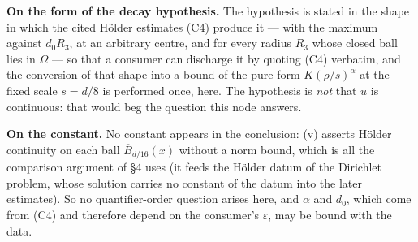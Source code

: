 \begin{lemma}
\noindent\textbf{On the form of the decay hypothesis.}  The hypothesis is
stated in the shape in which the cited H\"older estimates (C4) produce it ---
with the maximum against
$d_0R_3$, at an arbitrary centre, and for every radius $R_3$ whose closed ball
lies in $\Omega$ --- so that a consumer can discharge it by quoting (C4)
verbatim, and the conversion of that shape into a bound of the pure form
$K(\rho/s)^\alpha$ at the fixed scale $s=d/8$ is performed once, here.  The
hypothesis is \emph{not} that $u$ is continuous: that would beg the question
this node answers.

\noindent\textbf{On the constant.}  No constant appears in the conclusion: (v)
asserts H\"older continuity on each ball $\overline B_{d/16}(x)$ without a
norm bound, which is all the comparison argument of \S4 uses (it feeds the
H\"older datum of the Dirichlet problem, whose solution carries no constant of
the datum into the later estimates).  So no quantifier-order question arises
here, and $\alpha$ and $d_0$, which come from (C4) and therefore depend on the
consumer's $\varepsilon$, may be bound with the data.
\end{lemma}

